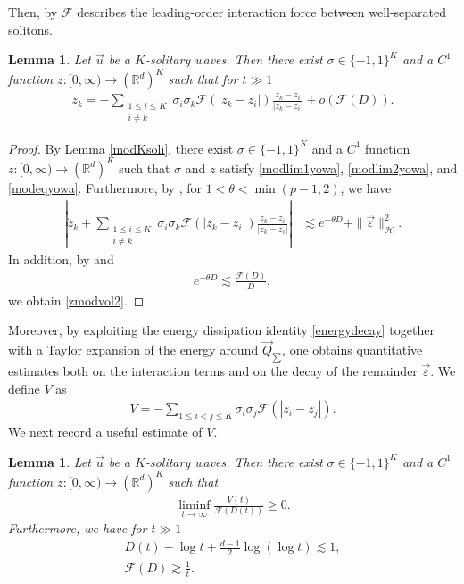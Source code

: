 \documentclass[reqno]{amsart}
\theoremstyle{plain}
\newtheorem{lemma}[theorem]{Lemma}
\theoremstyle{definition}
\numberwithin{equation}{section}
\newcommand{\1}{\mathbbm{1}}
\begin{document}
Then, by \cite[Section 3]{I2}  $\mathcal{F}$ describes the leading-order interaction force between well-separated solitons.
\begin{lemma}\label{centerdynamics}
Let $\vec{u}$ be a $K$-solitary waves. Then there  exist $\sigma\in\{-1,1\}^K$ and a $C^1$ function
$z:[0,\infty)\to (\mathbb{R}^d)^K$ such that for $t\gg 1$
\begin{align}\label{zmodvol2}
\dot{z}_k
=-\sum_{\substack{1\leq i\leq K\\ i\neq k}}\sigma_i\sigma_k\mathcal{F}(|z_k-z_i|)
\frac{z_k-z_i}{|z_k-z_i|}
+o(\mathcal{F}(D)).
\end{align}
\end{lemma}
\begin{proof}
By Lemma \ref{modKsoli}, there  exist $\sigma\in\{-1,1\}^K$ and a $C^1$ function
$z:[0,\infty)\to (\mathbb{R}^d)^K$ such that $\sigma$ and $z$ satisfy \eqref{modlim1yowa}, \eqref{modlim2yowa}, and \eqref{modeqyowa}.
Furthermore, by \cite[Lemma 3.3]{I2}, for $1<\theta<\min{(p-1,2)}$, we have
\begin{align}
\left|\dot{z}_k+\sum_{\substack{1\leq i\leq K\\ i\neq k}}\sigma_i\sigma_k\mathcal{F}(|z_k-z_i|)
\frac{z_k-z_i}{|z_k-z_i|}\right|
&\lesssim e^{-\theta D}+\|\vec{\varepsilon}\|_{\mathcal{H}}^2.\label{zes}
\end{align}
In addition, by \cite[Lemma 3.8]{I2} and
\begin{align*}
e^{-\theta D}\lesssim  \frac{\mathcal{F}(D)}{D},
\end{align*}
we obtain \eqref{zmodvol2}.
\end{proof}
Moreover, by exploiting the energy dissipation identity \eqref{energydecay} together with a Taylor expansion of the
energy around $\vec{Q}_{\sum}$, one obtains quantitative estimates both on the interaction terms and on the decay of the
remainder $\vec{\varepsilon}$. We define $V$ as 
\begin{align}\label{Vdef}
V=-\sum_{1\leq i<j\leq K}\sigma_i\sigma_j\mathcal{F}(|z_i-z_j|).
\end{align}
We next record a useful estimate of $V$.
\begin{lemma}\label{limeplem}
Let $\vec{u}$ be a $K$-solitary waves. Then there  exist $\sigma\in\{-1,1\}^K$ and a $C^1$ function
$z:[0,\infty)\to (\mathbb{R}^d)^K$ such that
\begin{align}\label{Ves1}
\liminf_{t\to\infty} \frac{V(t)}{\mathcal{F}(D(t))}\geq 0.
\end{align}
Furthermore, we have for $t\gg 1$
\begin{align}
D(t)-\log{t}+\frac{d-1}{2}\log{(\log{t})}\lesssim1, \label{Dupper}
\\
\mathcal{F}(D)\gtrsim \frac{1}{t}. \label{F(D)lower}
\end{align}
\end{lemma}
\end{document}
